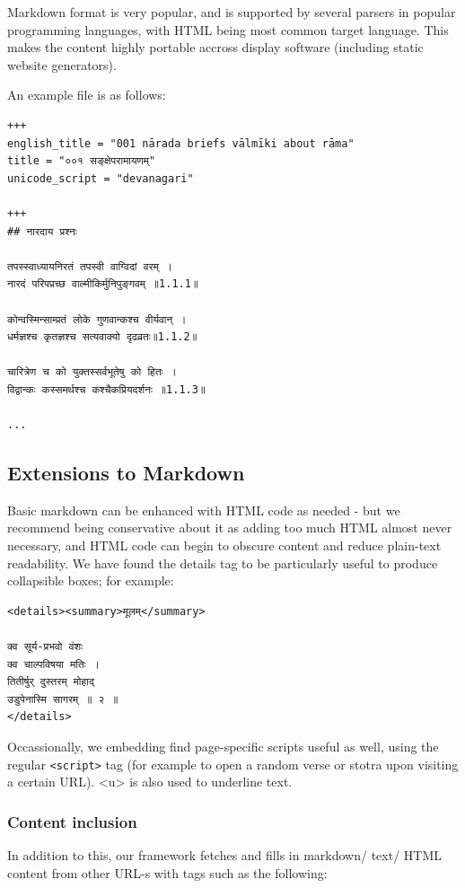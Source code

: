 \documentclass[11pt]{article}
\begin{document}
Markdown format is very popular, and is supported by several parsers in popular programming languages, with HTML being most common target language. This makes the content highly portable accross display software (including static website generators).

An example file is as follows:

\begin{verbatim}
+++
english_title = "001 nārada briefs vālmīki about rāma"
title = "००१ सङ्क्षेपरामायणम्"
unicode_script = "devanagari"

+++
## नारदाय प्रश्नः

तपस्स्वाध्यायनिरतं तपस्वी वाग्विदां वरम् ।  
नारदं परिपप्रच्छ वाल्मीकिर्मुनिपुङ्गवम् ॥1.1.1॥

कोन्वस्मिन्साम्प्रतं लोके गुणवान्कश्च वीर्यवान् ।  
धर्मज्ञश्च कृतज्ञश्च सत्यवाक्यो दृढव्रतः॥1.1.2॥

चारित्रेण च को युक्तस्सर्वभूतेषु को हितः ।  
विद्वान्कः कस्समर्थश्च कश्चैकप्रियदर्शनः ॥1.1.3॥

...
\end{verbatim}

\subsection{Extensions to Markdown}
Basic markdown can be enhanced with HTML code as needed - but we recommend being conservative about it as adding too much HTML almost never necessary, and HTML code can begin to obscure content and reduce plain-text readability. We have found the details tag to be particularly useful to produce collapsible boxes; for example:

\begin{verbatim}
<details><summary>मूलम्</summary>

क्व सूर्य-प्रभवो वंशः  
क्व चाल्पविषया मतिः ।  
तितीर्षुर् दुस्तरम् मोहाद्  
उडुपेनास्मि सागरम् ॥ २ ॥    
</details>
\end{verbatim}

Occassionally, we embedding find page-specific scripts useful as well, using the regular \verb'<script>' tag (for example to open a random verse or stotra upon visiting a certain URL). <u> is also used to underline text.

\subsubsection{Content inclusion}
In addition to this, our framework fetches and fills in markdown/ text/ HTML content from other URL-s with tags such as the following:
\end{document}
